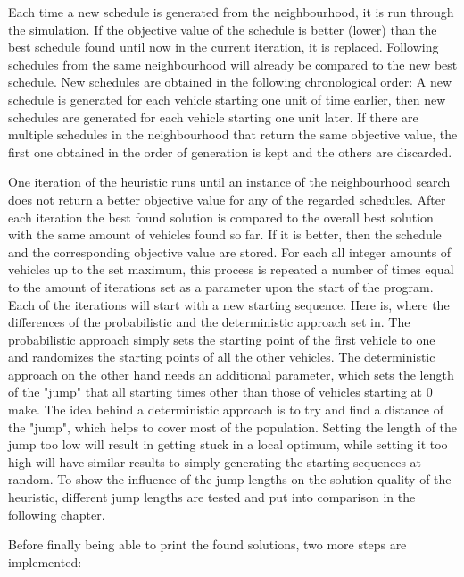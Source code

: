 Each time a new schedule is generated from the neighbourhood, it is run through the simulation. If the objective value of the schedule is better
(lower) than the best schedule found until now in the current iteration, it is replaced. Following schedules from the same neighbourhood will already
be compared to the new best schedule. New schedules are obtained in the following chronological order: A new schedule is generated for each vehicle
starting one unit of time earlier, then new schedules are generated for each vehicle starting one unit later. If there are multiple schedules in
the neighbourhood that return the same objective value, the first one obtained in the order of generation is kept and the others are discarded.

One iteration of the heuristic runs until an instance of the neighbourhood search does not return a better objective value for any of the regarded
schedules. After each iteration the best found solution is compared to the overall best solution with the same amount of vehicles found so far.
If it is better, then the schedule and the corresponding objective value are stored. For each all integer amounts of vehicles up to the set maximum,
this process is repeated a number of times equal to the amount of iterations set as a parameter upon the start of the program. Each of the iterations
will start with a new starting sequence. Here is, where the differences of the probabilistic and the deterministic approach set in. The probabilistic
approach simply sets the starting point of the first vehicle to one and randomizes the starting points of all the other vehicles. The deterministic
approach on the other hand needs an additional parameter, which sets the length of the "jump" that all starting times other than those of vehicles
starting at 0 make. The idea behind a deterministic approach is to try and find a distance of the "jump", which helps to cover most of the population.
Setting the length of the jump too low will result in getting stuck in a local optimum, while setting it too high will have similar results to simply
generating the starting sequences at random. To show the influence of the jump lengths on the solution quality of the heuristic, different jump lengths
are tested and put into comparison in the following chapter.

Before finally being able to print the found solutions, two more steps are implemented: 

